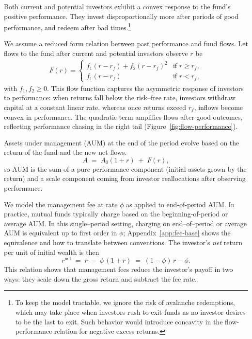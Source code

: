 \documentclass[11pt]{article}
\newcommand{\rf}{r_f}
\begin{document}
Both current and potential investors exhibit a convex response to the fund’s positive performance. They invest disproportionally more after periods of good performance, and redeem after bad times.\footnote{To keep the model tractable, we ignore the risk of avalanche redemptions, which may take place when investors rush to exit funds as no investor desires to be the last to exit. Such behavior would introduce concavity in the flow-performance relation for negative excess returns. }

We assume a reduced form relation between past performance and fund flows. Let flows to the fund after current and potential investors observe \(r\) be
\begin{align}
    \label{eq:flow}
    F(r) = \begin{cases} 
      f_1 (r-\rf) + f_2 (r-\rf)^2 & \text{if } r \ge \rf,\\[3pt]
      f_1 (r-\rf) & \text{if } r< \rf,
   \end{cases}
\end{align}
with \(f_1,f_2\ge 0\). This flow function captures the asymmetric response of investors to performance: when returns fall below the risk–free rate, investors withdraw capital at a constant linear rate, whereas once returns exceed $\rf$, inflows become convex in performance. The quadratic term amplifies flows after good outcomes, reflecting performance chasing in the right tail (Figure~\ref{fig:flow-performance}).

Assets under management (AUM) at the end of the period evolve based on the return of the fund and the new net flows. 
\begin{equation}
    A \;=\; A_0(1+r)\;+\;F(r),
\end{equation}
so AUM is the sum of a pure performance component (initial assets grown by the return) and a scale component coming from investor reallocations after observing performance.

We model the management fee at rate \(\phi\) as applied to end-of-period AUM. In practice, mutual funds typically charge based on the beginning-of-period or average AUM. In this single–period setting, charging on end–of–period or average AUM is equivalent up to first order in \(\phi\); Appendix~\ref{app:fee-base} shows the equivalence and how to translate between conventions. The investor’s \emph{net} return per unit of initial wealth is then
\begin{equation}
\label{eq:net-return}
r^{\text{net}} \;=\; r \;-\; \phi\,(1+r) \;=\; (1-\phi)\,r - \phi.
\end{equation}
This relation shows that management fees reduce the investor’s payoff in two ways: they scale down the gross return and subtract the fee rate.
\end{document}
